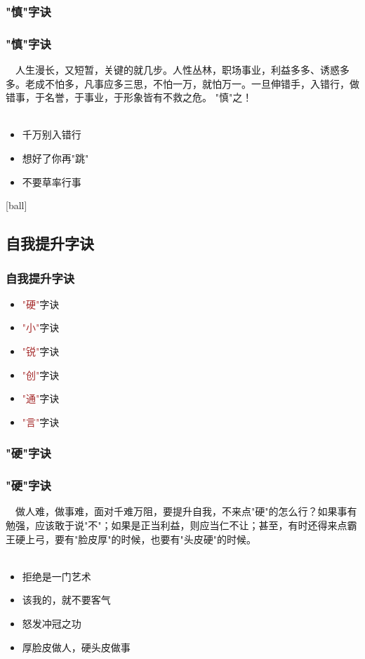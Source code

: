\subsubsection{"慎"字诀}
\begin{frame}
\frametitle{"慎"字诀}
\noindent\handr~~人生漫长，又短暂，关键的就几步。人性丛林，职场事业，利益多多、诱惑多多。老成不怕多，凡事应多三思，不怕一万，就怕万一。一旦伸错手，入错行，做错事，于名誉，于事业，于形象皆有不救之危。 "慎"之！
~\\
~\\
\begin{itemize}
    \item 千万别入错行
    \item 想好了你再"跳"
    \item 不要草率行事
\end{itemize}
\end{frame}

[ball]

\subsection{自我提升字诀}
\begin{frame}
\frametitle{自我提升字诀}
\begin{itemize}
    \item \textcolor{brown}{"硬"}字诀
    \item \textcolor{brown}{"小"}字诀
    \item \textcolor{brown}{"锐"}字诀
    \item \textcolor{brown}{"创"}字诀
    \item \textcolor{brown}{"通"}字诀
    \item \textcolor{brown}{"言"}字诀
\end{itemize}
\end{frame}


\subsubsection{"硬"字诀}
\begin{frame}
\frametitle{"硬"字诀}
\noindent\handr~~做人难，做事难，面对千难万阻，要提升自我，不来点"硬"的怎么行？如果事有勉强，应该敢于说"不"；如果是正当利益，则应当仁不让；甚至，有时还得来点霸王硬上弓，要有"脸皮厚"的时候，也要有"头皮硬"的时候。
~\\
~\\
\begin{itemize}
    \item 拒绝是一门艺术
    \item 该我的，就不要客气
    \item 怒发冲冠之功
    \item 厚脸皮做人，硬头皮做事
\end{itemize}
\end{frame}

